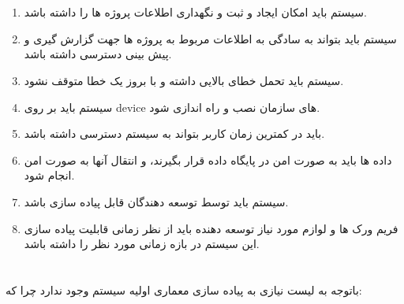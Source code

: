 \documentclass{article}
\begin{document}
\newpage

\section{}
\begin{enumerate}
\item سیستم باید امکان ایجاد و ثبت و نگهداری اطلاعات پروژه ها را داشته باشد.
\item سیستم باید بتواند به سادگی به اطلاعات مربوط به پروژه ها جهت گزارش گیری و پیش بینی دسترسی داشته باشد.
\item سیستم باید تحمل خطای بالایی داشته و با بروز یک خطا متوقف نشود.
\item سیستم باید بر روی device های سازمان نصب و راه اندازی شود.
\item باید در کمترین زمان کاربر بتواند به سیستم دسترسی داشته باشد.
\item داده ها باید به صورت امن در پایگاه داده قرار بگیرند، و انتقال آنها به صورت امن انجام شود.
\item سیستم باید توسط توسعه دهندگان قابل پیاده سازی باشد.
\item فریم ورک ها و لوازم مورد نیاز توسعه دهنده باید از نظر زمانی قابلیت پیاده سازی این سیستم در بازه زمانی مورد نظر را داشته باشد.
\end{enumerate}

\vspace{0.5cm}
\section{}
باتوجه به لیست  نیازی به پیاده سازی معماری اولیه سیستم وجود ندارد چرا که:
\end{document}
